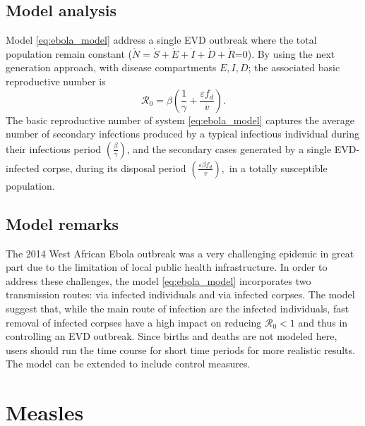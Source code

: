 \documentclass{book}
\begin{document}
\subsection*{Model analysis}
Model \eqref{eq:ebola_model} address a single EVD outbreak where the total population remain constant ($\dot{N}=\dot{S}+\dot{E}+\dot{I}+\dot{D}+\dot{R}$=0).
By using the next generation approach, with disease compartments $E, I, D$; the associated
basic reproductive number is
\begin{equation} \label{eq:brn_ebola}
\mathscr{R}_{0}=\beta\left(\frac{1}{\gamma}+\frac{\varepsilon f_{d}}{v}\right).
\end{equation}
The basic reproductive number of system \eqref{eq:ebola_model} captures the average number of secondary
infections produced by a typical infectious individual during their infectious period $\left(\frac{\beta}{\gamma}\right)$,
and the secondary cases generated by a single EVD-infected corpse, during its disposal
period $\left(\frac{\varepsilon \beta f_{d}}{v}\right),$ in a totally susceptible population.


\subsection*{Model remarks}
The 2014 West African Ebola outbreak was a very challenging epidemic in great part due to the limitation of local public health infrastructure.
In order to address these challenges, the model \eqref{eq:ebola_model} incorporates two transmission routes: via infected individuals and via infected corpses. The model suggest that, while the main route of infection are the infected individuals, fast removal of infected corpses have a high impact on reducing $\mathcal{R}_0<1$ and thus in controlling an EVD outbreak.
Since births and deaths are not modeled here, users should run the time course for short time periods for more realistic results. The model can be extended to include control measures.


\section{Measles}
\end{document}
